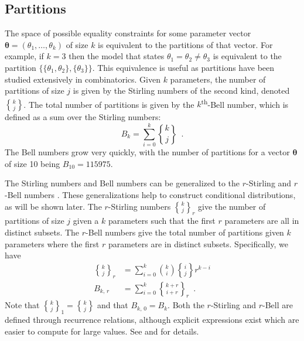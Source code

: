 \documentclass[11pt,a4paper]{article}
\theoremstyle{definition} %
\theoremstyle{case}
\DeclareRobustCommand{\stirling}{\genfrac\{\}{0pt}{}}
\newcommand{\rstirling}[3]{\stirling{#1}{#2}_{#3}}
\newcommand{\bellnum}[1]{B_{#1}}
\newcommand{\rbellnum}[2]{B_{#1,\,#2}}
\begin{document}
\subsection{Partitions}
The space of possible equality constraints for some parameter vector $\mathbf{\theta} = (\theta_1, \ldots, \theta_k)$ of size $k$ is equivalent to the partitions of that vector. For example, if $k = 3$ then the model that states $\theta_1 = \theta_2 \neq \theta_3$ is equivalent to the partition $\{\{\theta_1, \theta_2\}, \{\theta_3\}\}$. This equivalence is useful as partitions have been studied extensively in combinatorics. Given $k$ parameters, the number of partitions of size $j$ is given by the Stirling numbers of the second kind, denoted $\stirling{k}{j}$. The total number of partitions is given by the $k$\textsuperscript{th}-Bell number, which is defined as a sum over the Stirling numbers:
\begin{equation}
    \bellnum{k} = \sum_{i = 0}^k \stirling{k}{j} \enspace .
\end{equation}
The Bell numbers grow very quickly, with the number of partitions for a vector $\mathbf{\theta}$ of size 10 being $B_{10} =115975$. %

The Stirling numbers and Bell numbers can be generalized to the $r$-Stirling \parencite{broder1984r} and $r$-Bell numbers \parencite{mezo2011r}. These generalizations help to construct conditional distributions, as will be shown later. The $r$-Stirling numbers $\rstirling{k}{j}{r}$ give the number of partitions of size $j$ given a $k$ parameters such that the first $r$ parameters are all in distinct subsets. The $r$-Bell numbers give the total number of partitions given $k$ parameters where the first $r$ parameters are in distinct subsets. Specifically, we have
\begin{align}
    \rstirling{k}{j}{r} &= \sum_{i=0}^k \binom{k}{i}\stirling{i}{j}r^{k-i}\\
    \rbellnum{k}{r} &= \sum_{i=0}^k \rstirling{k+r}{i+r}{r} \enspace .
\end{align}
Note that $\rstirling{k}{j}{1} = \stirling{k}{j}$ and that $\rbellnum{k}{0} = \bellnum{k}$. Both the $r$-Stirling and $r$-Bell are defined through recurrence relations, although explicit expressions exist which are easier to compute for large values. See \textcite{broder1984r} and \textcite{mezo2011r} for details.
\end{document}
